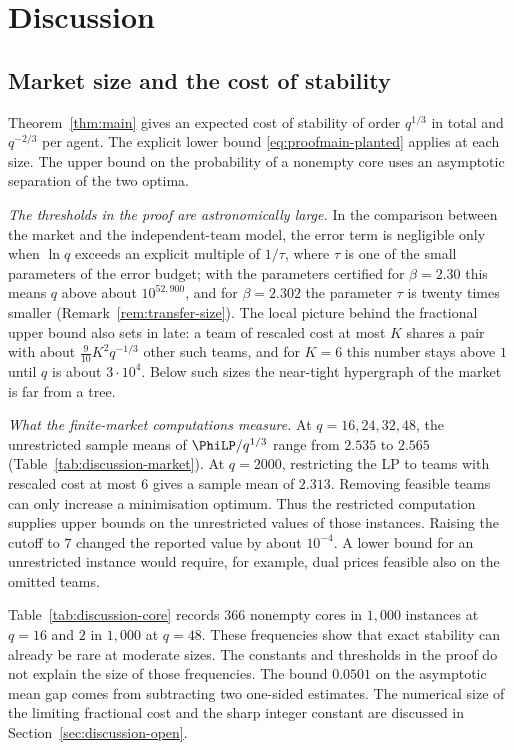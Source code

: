 \section{Discussion}\label{sec:discussion}

\subsection{Market size and the cost of stability}\label{sec:discussion-scope}

Theorem~\ref{thm:main} gives an expected cost of stability of order $q^{1/3}$ in total
and $q^{-2/3}$ per agent. The explicit lower bound
\eqref{eq:proofmain-planted} applies at each size. The upper bound on the probability
of a nonempty core uses an asymptotic separation of the two optima.

\emph{The thresholds in the proof are astronomically large.} In the comparison between the
market and the independent-team model, the error term is negligible only when $\ln q$
exceeds an explicit multiple of $1/\tau$, where $\tau$ is one of the small parameters of the
error budget; with the parameters certified for $\beta=2.30$ this means $q$ above about
$10^{52{,}900}$, and for $\beta=2.302$ the parameter $\tau$ is twenty times smaller
(Remark~\ref{rem:transfer-size}). The local picture behind the fractional upper bound also sets in late: a
team of rescaled cost at most $K$ shares a pair with about $\tfrac{9}{10}K^2q^{-1/3}$ other
such teams, and for $K=6$ this number stays above $1$ until $q$ is about $3\cdot10^4$. Below
such sizes the near-tight hypergraph of the market is far from a tree.

\emph{What the finite-market computations measure.}
At $q=16,24,32,48$, the unrestricted sample means of $\PhiLP/q^{1/3}$
range from $2.535$ to $2.565$ (Table~\ref{tab:discussion-market}).
At $q=2000$, restricting the LP to teams with rescaled cost at most $6$ gives a
sample mean of $2.313$. Removing feasible teams can only increase a minimisation
optimum. Thus the restricted computation supplies upper bounds on the unrestricted
values of those instances. Raising the cutoff to $7$ changed the reported value
by about $10^{-4}$. A lower bound for an unrestricted instance would require, for
example, dual prices feasible also on the omitted teams.

Table~\ref{tab:discussion-core} records $366$ nonempty cores in $1{,}000$ instances
at $q=16$ and $2$ in $1{,}000$ at $q=48$. These frequencies show that exact stability
can already be rare at moderate sizes. The constants and thresholds in the proof
do not explain the size of those frequencies. The bound $0.0501$ on the
asymptotic mean gap comes from subtracting two one-sided estimates. The numerical
size of the limiting fractional cost and the sharp integer constant are discussed
in Section~\ref{sec:discussion-open}.

